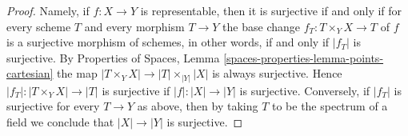 \documentclass[10pt,a4paper]{amsart}
\theoremstyle{plain}
\theoremstyle{definition}
\theoremstyle{remark}
\numberwithin{equation}{subsection}
\begin{document}
\begin{proof}
Namely, if $f : X \to Y$ is representable, then it is surjective if and only if
for every scheme $T$ and every morphism $T \to Y$ the base change
$f_T : T \times_Y X \to T$ of $f$ is a surjective morphism of schemes,
in other words, if and only if $|f_T|$ is surjective. By
Properties of Spaces, Lemma \ref{spaces-properties-lemma-points-cartesian}
the map $|T \times_Y X| \to |T| \times_{|Y|} |X|$ is always surjective.
Hence $|f_T| : |T \times_Y X| \to |T|$ is surjective if $|f| : |X| \to |Y|$
is surjective. Conversely, if $|f_T|$ is surjective
for every $T \to Y$ as above, then by taking $T$ to be the spectrum of a
field we conclude that $|X| \to |Y|$ is surjective.
\end{proof}
\end{document}
